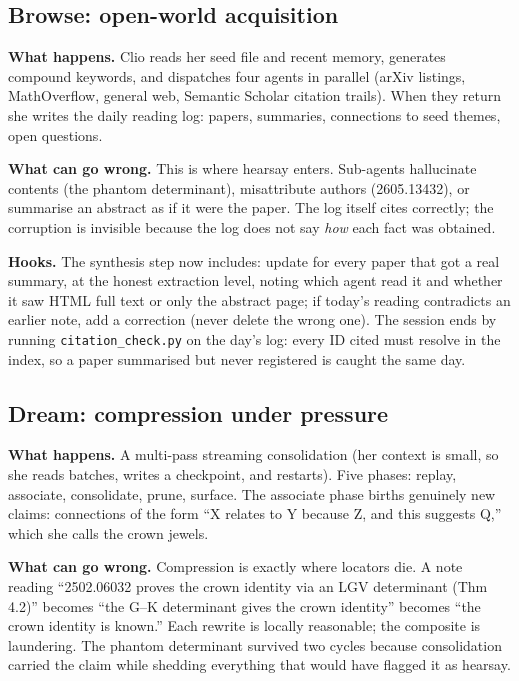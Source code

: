 \documentclass[11pt,a4paper]{article}
\begin{document}
\subsection{Browse: open-world acquisition}

\textbf{What happens.} Clio reads her seed file and recent memory, generates
compound keywords, and dispatches four agents in parallel (arXiv listings,
MathOverflow, general web, Semantic Scholar citation trails). When they
return she writes the daily reading log: papers, summaries, connections to
seed themes, open questions.

\textbf{What can go wrong.} This is where hearsay enters. Sub-agents
hallucinate contents (the phantom determinant), misattribute authors
(2605.13432), or summarise an abstract as if it were the paper. The log
itself cites correctly; the corruption is invisible because the log does not
say \emph{how} each fact was obtained.

\textbf{Hooks.} The synthesis step now includes: update
 for every paper that got a real summary, at the honest
extraction level, noting which agent read it and whether it saw HTML full
text or only the abstract page; if today's reading contradicts an earlier
note, add a correction (never delete the wrong one). The session ends by
running \texttt{citation\_check.py} on the day's log: every ID cited must
resolve in the index, so a paper summarised but never registered is caught
the same day.

\subsection{Dream: compression under pressure}

\textbf{What happens.} A multi-pass streaming consolidation (her context is
small, so she reads batches, writes a checkpoint, and restarts). Five
phases: replay, associate, consolidate, prune, surface. The associate phase
births genuinely new claims: connections of the form ``X relates to Y
because Z, and this suggests Q,'' which she calls the crown jewels.

\textbf{What can go wrong.} Compression is exactly where locators die. A
note reading ``2502.06032 proves the crown identity via an LGV determinant
(Thm 4.2)'' becomes ``the G--K determinant gives the crown identity''
becomes ``the crown identity is known.'' Each rewrite is locally reasonable;
the composite is laundering. The phantom determinant survived two cycles
because consolidation carried the claim while shedding everything that would
have flagged it as hearsay.
\end{document}
